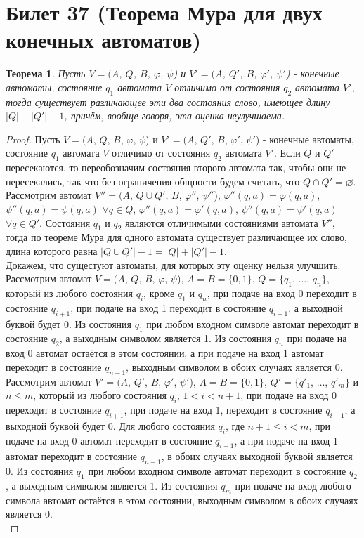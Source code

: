 \documentclass[a4paper, 12pt]{article}
\renewcommand{\phi}{\varphi}
\theoremstyle{definition}
\theoremstyle{plain}
\newtheorem*{theorem}{Теорема}
\theoremstyle{remark}
\begin{document}
  \section{Билет 37 (Теорема Мура для двух конечных автоматов)}
  \begin{theorem}
    Пусть $V=(A$, $Q$, $B$, $\phi$, $\psi$) и $V'=(A$, $Q'$, $B$, $\phi'$, $\psi'$) - конечные автоматы, состояние $q_1$ автомата $V$ отличимо от состояния $q_2$ автомата $V'$, тогда существует различающее эти два состояния слово, имеющее длину $|Q|+|Q'|-1$, причём, вообще говоря, эта оценка неулучшаема.
  \end{theorem}
  \begin{proof}
    Пусть $V=(A$, $Q$, $B$, $\phi$, $\psi$) и $V'=(A$, $Q'$, $B$, $\phi'$, $\psi'$) - конечные автоматы, состояние $q_1$ автомата $V$ отличимо от состояния $q_2$ автомата $V'$. Если $Q$ и $Q'$пересекаются, то переобозначим состояния второго автомата так, чтобы они не пересекались, так что без ограничения общности будем считать, что $Q\cap Q'=\varnothing$. Рассмотрим автомат $V''=(A$, $Q\cup Q'$, $B$, $\phi''$, $\psi''$), $\phi''(q,a)=\phi(q,a)$, $\psi''(q,a)=\psi(q,a)$ $\forall q\in Q$, $\phi''(q,a)=\phi'(q,a)$, $\psi''(q,a)=\psi'(q,a)$ $\forall q\in Q'$. Состояния $q_1$ и $q_2$ являются отличимыми состояниями автомата $V''$, тогда по теореме Мура для одного автомата существует различающее их слово, длина которого равна $|Q\cup Q'|-1=|Q|+|Q'|-1$.\\
    Докажем, что сущестуют автоматы, для которых эту оценку нельзя улучшить. Рассмотрим автомат $V=(A$, $Q$, $B$, $\phi$, $\psi$), $A=B=\{0,1\}$, $Q=\{q_1$, $\ldots$, $q_n\}$, который из любого состояния $q_i$, кроме $q_1$ и $q_n$, при подаче на вход 0 переходит в состояние $q_{i+1}$, при подаче на вход 1 переходит в состояние $q_{i-1}$, а выходной буквой будет 0. Из состояния $q_1$ при любом входном символе автомат переходит в состояние $q_2$, а выходным символом является 1. Из состояния $q_n$ при подаче на вход 0 автомат остаётся в  этом состоянии, а при подаче на вход 1 автомат переходит в состояние $q_{n-1}$, выходным символом в обоих случаях является 0.\\
    Рассмотрим автомат $V'=(A$, $Q'$, $B$, $\phi'$, $\psi'$), $A=B=\{0,1\}$, $Q'=\{q'_1$, $\ldots$, $q'_m\}$ и $n\leqslant m$, который из любого состояния $q_i$, $1<i<n+1$, при подаче на вход 0 переходит в состояние $q_{i+1}$, при подаче на вход 1, переходит в состояние $q_{i-1}$, а выходной буквой будет 0. Для любого состояния $q_i$, где $n+1\leqslant i<m$, при подаче на вход 0 автомат переходит в состояние $q_{i+1}$, а при подаче на вход 1 автомат переходит в состояние $q_{n-1}$, в обоих случаях выходной буквой является 0. Из состояния $q_1$ при любом входном символе автомат переходит в состояние $q_2$, а выходным символом является 1. Из состояния $q_m$ при подаче на вход любого символа автомат остаётся в этом состоянии, выходным символом в обоих случаях является 0.\\

\end{proof}
\end{document}
